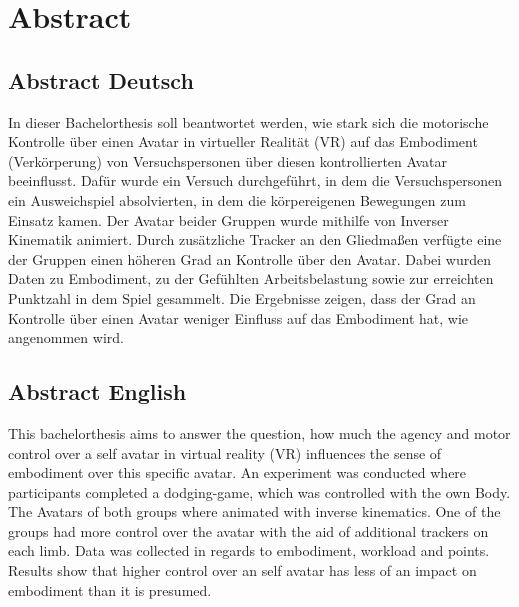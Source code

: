 \chapter*{Abstract}

\section*{Abstract Deutsch}
In dieser Bachelorthesis soll beantwortet werden, wie stark sich die motorische Kontrolle über einen Avatar in virtueller Realität (VR) auf das Embodiment (Verkörperung) von Versuchspersonen über diesen kontrollierten Avatar beeinflusst. Dafür wurde ein Versuch durchgeführt, in dem die Versuchspersonen ein Ausweichspiel absolvierten, in dem die körpereigenen Bewegungen zum Einsatz kamen. Der Avatar beider Gruppen wurde mithilfe von Inverser Kinematik animiert. Durch zusätzliche Tracker an den Gliedmaßen verfügte eine der Gruppen einen höheren Grad an Kontrolle über den Avatar. Dabei wurden Daten zu Embodiment, zu der Gefühlten Arbeitsbelastung sowie zur erreichten Punktzahl in dem Spiel gesammelt. Die Ergebnisse zeigen, dass der Grad an Kontrolle über einen Avatar weniger Einfluss auf das Embodiment hat, wie angenommen wird.


\section*{Abstract English}
This bachelorthesis aims to answer the question, how much the agency and motor control over a self avatar in virtual reality (VR) influences the sense of embodiment over this specific avatar. An experiment was conducted where participants completed a dodging-game, which was controlled with the own Body. The Avatars of both groups where animated with inverse kinematics. One of the groups had more control over the avatar with the aid of additional trackers on each limb. Data was collected in regards to embodiment, workload and points. Results show that higher control over an self avatar has less of an impact on embodiment than it is presumed.